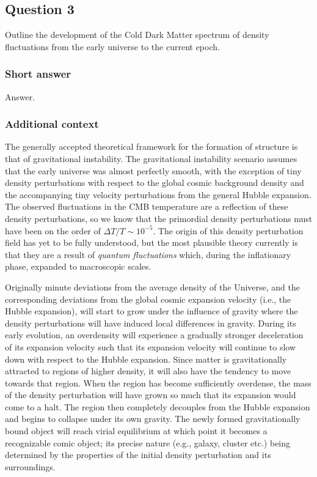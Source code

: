 \documentclass[a4paper,11pt]{article}
\begin{document}
\newpage
\subsection{Question 3}

Outline the development of the Cold Dark Matter spectrum of density fluctuations from the early universe to the current epoch.

\subsubsection{Short answer}

Answer.

\subsubsection{Additional context}

The generally accepted theoretical framework for the formation of structure is that of gravitational instability. The gravitational instability scenario assumes that the early universe was almost perfectly smooth, with the exception of tiny density perturbations with respect to the global cosmic background density and the accompanying tiny velocity perturbations from the general Hubble expansion. The observed fluctuations in the CMB temperature are a reflection of these density perturbations, so we know that the primordial density perturbations must have been on the order of $\Delta T / T \sim 10^{-5}$. The origin of this density perturbation field has yet to be fully understood, but the most plausible theory currently is that they are a result of \textit{quantum fluctuations} which, during the inflationary phase, expanded to macroscopic scales.

{\noindent}Originally minute deviations from the average density of the Universe, and the corresponding deviations from the global cosmic expansion velocity (i.e., the Hubble expansion), will start to grow under the influence of gravity where the density perturbations will have induced local differences in gravity. During its early evolution, an overdensity will experience a gradually stronger deceleration of its expansion velocity such that its expansion velocity will continue to slow down with respect to the Hubble expansion. Since matter is gravitationally attracted to regions of higher density, it will also have the tendency to move towards that region. When the region has become sufficiently overdense, the mass of the density perturbation will have grown so much that its expansion would come to a halt. The region then completely decouples from the Hubble expansion and begins to collapse under its own gravity. The newly formed gravitationally bound object will reach virial equilibrium at which point it becomes a recognizable comic object; its precise nature (e.g., galaxy, cluster etc.) being determined by the properties of the initial density perturbation and its surroundings.
\end{document}
